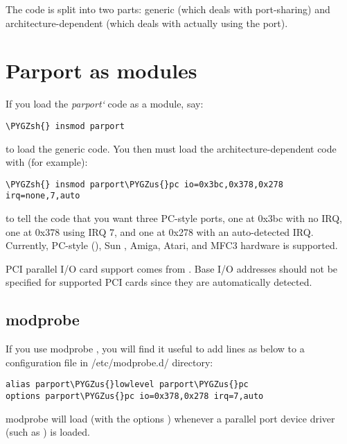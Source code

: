 \documentclass[a4paper,8pt,english]{sphinxmanual}
\def\PYGZus{\char`\_}
\def\PYGZsh{\char`\#}
\begin{document}
The  code is split into two parts: generic (which deals with
port-sharing) and architecture-dependent (which deals with actually
using the port).


\section{Parport as modules}
\label{admin-guide/parport:parport-as-modules}
If you load the \emph{parport{}`} code as a module, say:

\begin{Verbatim}[commandchars=\\\{\}]
\PYGZsh{} insmod parport
\end{Verbatim}

to load the generic  code.  You then must load the
architecture-dependent code with (for example):

\begin{Verbatim}[commandchars=\\\{\}]
\PYGZsh{} insmod parport\PYGZus{}pc io=0x3bc,0x378,0x278 irq=none,7,auto
\end{Verbatim}

to tell the  code that you want three PC-style ports, one at
0x3bc with no IRQ, one at 0x378 using IRQ 7, and one at 0x278 with an
auto-detected IRQ.  Currently, PC-style (), Sun ,
Amiga, Atari, and MFC3 hardware is supported.

PCI parallel I/O card support comes from .  Base I/O
addresses should not be specified for supported PCI cards since they
are automatically detected.


\subsection{modprobe}
\label{admin-guide/parport:modprobe}
If you use modprobe , you will find it useful to add lines as below to a
configuration file in /etc/modprobe.d/ directory:

\begin{Verbatim}[commandchars=\\\{\}]
alias parport\PYGZus{}lowlevel parport\PYGZus{}pc
options parport\PYGZus{}pc io=0x378,0x278 irq=7,auto
\end{Verbatim}

modprobe will load  (with the options )
whenever a parallel port device driver (such as ) is loaded.
\end{document}
